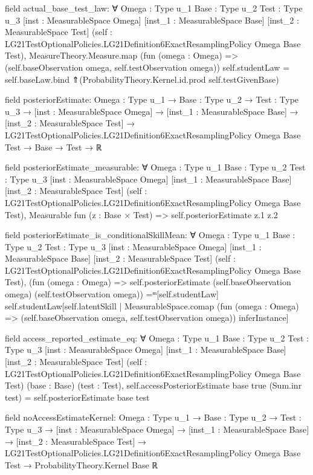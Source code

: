 \documentclass[10pt]{article}
\begin{document}
\begin{ReviewVerbatim}
field actual_base_test_law:
∀ {Omega : Type u_1} {Base : Type u_2} {Test : Type u_3} [inst : MeasurableSpace Omega] [inst_1 : MeasurableSpace Base]
  [inst_2 : MeasurableSpace Test]
  (self : LG21TestOptionalPolicies.LG21Definition6ExactResamplingPolicy Omega Base Test),
  MeasureTheory.Measure.map (fun (omega : Omega) => (self.baseObservation omega, self.testObservation omega))
      self.studentLaw =
    self.baseLaw.bind ⇑(ProbabilityTheory.Kernel.id.prod self.testGivenBase)

field posteriorEstimate:
{Omega : Type u_1} →
  {Base : Type u_2} →
    {Test : Type u_3} →
      [inst : MeasurableSpace Omega] →
        [inst_1 : MeasurableSpace Base] →
          [inst_2 : MeasurableSpace Test] →
            LG21TestOptionalPolicies.LG21Definition6ExactResamplingPolicy Omega Base Test → Base → Test → ℝ

field posteriorEstimate_measurable:
∀ {Omega : Type u_1} {Base : Type u_2} {Test : Type u_3} [inst : MeasurableSpace Omega] [inst_1 : MeasurableSpace Base]
  [inst_2 : MeasurableSpace Test]
  (self : LG21TestOptionalPolicies.LG21Definition6ExactResamplingPolicy Omega Base Test),
  Measurable fun (z : Base × Test) => self.posteriorEstimate z.1 z.2

field posteriorEstimate_is_conditionalSkillMean:
∀ {Omega : Type u_1} {Base : Type u_2} {Test : Type u_3} [inst : MeasurableSpace Omega] [inst_1 : MeasurableSpace Base]
  [inst_2 : MeasurableSpace Test]
  (self : LG21TestOptionalPolicies.LG21Definition6ExactResamplingPolicy Omega Base Test),
  (fun (omega : Omega) =>
      self.posteriorEstimate (self.baseObservation omega) (self.testObservation omega)) =ᵐ[self.studentLaw]
    self.studentLaw[self.latentSkill |
      MeasurableSpace.comap (fun (omega : Omega) => (self.baseObservation omega, self.testObservation omega))
        inferInstance]

field access_reported_estimate_eq:
∀ {Omega : Type u_1} {Base : Type u_2} {Test : Type u_3} [inst : MeasurableSpace Omega] [inst_1 : MeasurableSpace Base]
  [inst_2 : MeasurableSpace Test] (self : LG21TestOptionalPolicies.LG21Definition6ExactResamplingPolicy Omega Base Test)
  (base : Base) (test : Test), self.accessPosteriorEstimate base true (Sum.inr test) = self.posteriorEstimate base test

field noAccessEstimateKernel:
{Omega : Type u_1} →
  {Base : Type u_2} →
    {Test : Type u_3} →
      [inst : MeasurableSpace Omega] →
        [inst_1 : MeasurableSpace Base] →
          [inst_2 : MeasurableSpace Test] →
            LG21TestOptionalPolicies.LG21Definition6ExactResamplingPolicy Omega Base Test →
              ProbabilityTheory.Kernel Base ℝ


\end{ReviewVerbatim}
\end{document}

